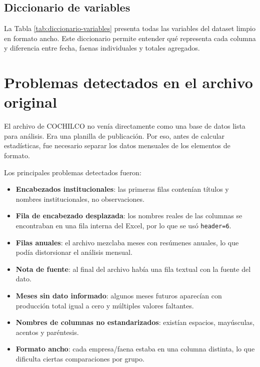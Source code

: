 \documentclass[11pt,letterpaper]{article}
\begin{document}
\subsection{Diccionario de variables}

La Tabla \ref{tab:diccionario-variables} presenta todas las variables del dataset limpio en formato ancho. Este diccionario permite entender qué representa cada columna y diferencia entre fecha, faenas individuales y totales agregados.

\begin{center}
\label{tab:diccionario-variables}

\end{center}

\section{Problemas detectados en el archivo original}

El archivo de COCHILCO no venía directamente como una base de datos lista para análisis. Era una planilla de publicación. Por eso, antes de calcular estadísticas, fue necesario separar los datos mensuales de los elementos de formato.

Los principales problemas detectados fueron:

\begin{itemize}[itemsep=0.2em]
    \item \textbf{Encabezados institucionales}: las primeras filas contenían títulos y nombres institucionales, no observaciones.
    \item \textbf{Fila de encabezado desplazada}: los nombres reales de las columnas se encontraban en una fila interna del Excel, por lo que se usó \texttt{header=6}.
    \item \textbf{Filas anuales}: el archivo mezclaba meses con resúmenes anuales, lo que podía distorsionar el análisis mensual.
    \item \textbf{Nota de fuente}: al final del archivo había una fila textual con la fuente del dato.
    \item \textbf{Meses sin dato informado}: algunos meses futuros aparecían con producción total igual a cero y múltiples valores faltantes.
    \item \textbf{Nombres de columnas no estandarizados}: existían espacios, mayúsculas, acentos y paréntesis.
    \item \textbf{Formato ancho}: cada empresa/faena estaba en una columna distinta, lo que dificulta ciertas comparaciones por grupo.
\end{itemize}
\end{document}
